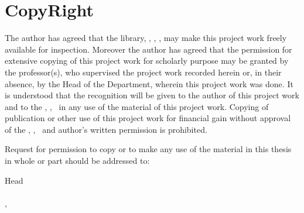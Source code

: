 \section*{CopyRight}
\vspace{-0.5cm}

The author has agreed that the library, \thedepartment, \theinstitute, \thecampus, may make this project
work freely available for inspection. Moreover the author has agreed that the
permission for extensive copying of this project work for scholarly purpose may be
granted by the professor(s), who supervised the project work recorded herein or, in
their absence, by the Head of the Department, wherein this project work was done. It
is understood that the recognition will be given to the author of this project work and
to the \thedepartment, \theinstitute, \thecampus \ in any use of the material of this project work. Copying of publication or other use of
this project work for financial gain without approval of the \thedepartment, \theinstitute, \thecampus \ and author’s
written permission is prohibited.

Request for permission to copy or to make any use of the material in this thesis in
whole or part should be addressed to:

\vspace{1cm}

Head\\
\thedepartment\\
\theinstitute, \thecampus\\
\thedepartmentFullAddress

